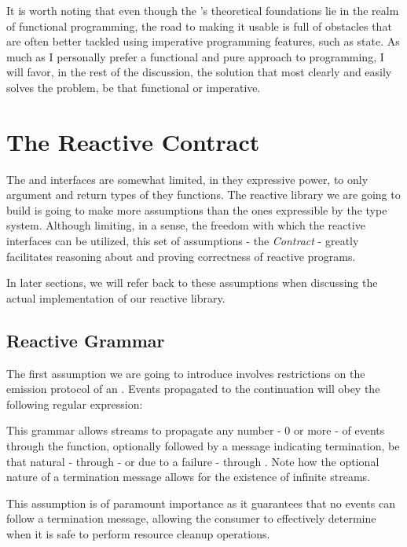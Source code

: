 It is worth noting that even though the 's theoretical foundations lie in the realm of functional programming, the road to making it usable is full of obstacles that are often better tackled using imperative programming features, such as state. As much as I personally prefer a functional and pure approach to programming, I will favor, in the rest of the discussion, the solution that most clearly and easily solves the problem, be that functional or imperative.

\section{The Reactive Contract}
\label{sec:contract}

The  and  interfaces are somewhat limited, in they expressive power, to only argument and return types of they functions. The reactive library we are going to build is going to make more assumptions than the ones expressible by the type system. Although limiting, in a sense, the freedom with which the reactive interfaces can be utilized, this set of assumptions - the \textit{Contract} - greatly facilitates reasoning about and proving correctness of reactive programs\cite{MS2010-RxDesign}.

In later sections, we will refer back to these assumptions when discussing the actual implementation of our reactive library.

\subsection{Reactive Grammar}
\label{ass-grammar}
The first assumption we are going to introduce involves restrictions on the emission protocol of an . Events propagated to the  continuation will obey the following regular expression:

\begin{center}\end{center}

This grammar allows streams to propagate any number - 0 or more - of events through the  function, optionally followed by a message indicating termination, be that natural - through  - or due to a failure - through . Note how the optional nature of a termination message allows for the existence of infinite streams. 

This assumption is of paramount importance as it guarantees that no events can follow a termination message, allowing the consumer to effectively determine when it is safe to perform resource cleanup operations. 

